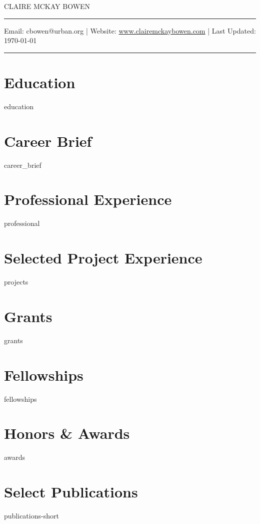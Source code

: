 \documentclass[11pt, letterpaper, roman]{moderncv} %
\begin{document}
\vspace{-10pt}
\centerline{\huge{CLAIRE MCKAY BOWEN}}
\vspace{10pt}
\hrule
\vspace{5pt}
\centerline{\small Email: cbowen@urban.org | Website: \href{https://www.clairemckaybowen.com}{www.clairemckaybowen.com} | Last Updated: \today}
\vspace{5pt}
\hrule

\section{Education}
{education}

\vspace{-10pt}
\section{Career Brief}
{career_brief}

\vspace{-10pt}
\section{Professional Experience}
{professional}

\vspace{-10pt}
\section{Selected Project Experience}
{projects}
    
\newpage
\section{Grants}
{grants}

\section{Fellowships}
{fellowships}

\vspace{-10pt}
\section{Honors \& Awards}
{awards}
    
\section{Select Publications}
{publications-short}
\end{document}
